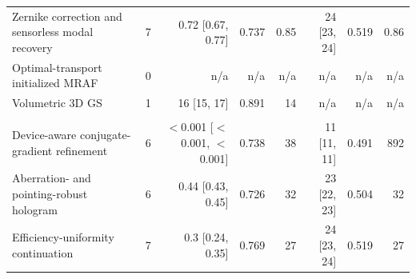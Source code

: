\begin{table}[t]
\begin{tabular}{@{}>{\raggedright\arraybackslash}p{} r r r r r r r@{}}
Zernike correction and sensorless modal recovery & 7 & 0.72 [0.67, 0.77] & 0.737 & 0.85 & 24 [23, 24] & 0.519 & 0.86\\
Optimal-transport initialized MRAF & 0 & n/a & n/a & n/a & n/a & n/a & n/a\\
Volumetric 3D GS & 1 & 16 [15, 17] & 0.891 & 14 & n/a & n/a & n/a\\
\multicolumn{8}{@{}l}{\textit{Methods proposed here}}\\
Device-aware conjugate-gradient refinement & 6 & $<$0.001 [$<$0.001, $<$0.001] & 0.738 & 38 & 11 [11, 11] & 0.491 & 892\\
Aberration- and pointing-robust hologram & 6 & 0.44 [0.43, 0.45] & 0.726 & 32 & 23 [22, 23] & 0.504 & 32\\
Efficiency-uniformity continuation & 7 & 0.3 [0.24, 0.35] & 0.769 & 27 & 24 [23, 24] & 0.519 & 27\\
\bottomrule\end{tabular}\end{table}
